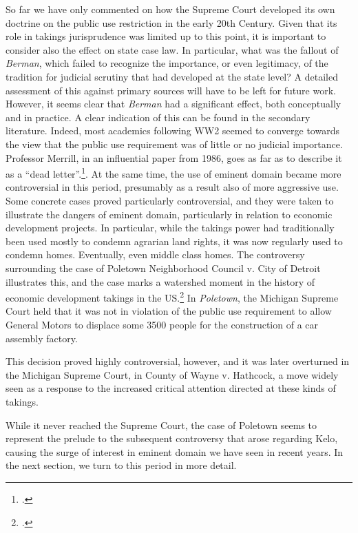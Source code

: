 So far we have only commented on how the Supreme Court developed its own doctrine on the public use restriction in the early 20th Century. Given that its role in takings jurisprudence was limited up to this point, it is important to consider also the effect on state case law. In particular, what was the fallout of {\it Berman}, which failed to recognize the importance, or even legitimacy, of the tradition for judicial scrutiny that had developed at the state level? A detailed assessment of this against primary sources will have to be left for future work. However, it seems clear that {\it Berman} had a significant effect, both conceptually and in practice. A clear indication of this can be found in the secondary literature. Indeed, most academics following WW2 seemed to converge towards the view that the public use requirement was of little or no judicial importance. Professor Merrill, in an influential paper from 1986, goes as far as to describe it as a ``dead letter''.\footcite[]{merrill86}. At the same time, the use of eminent domain became more controversial in this period, presumably as a result also of more aggressive use. Some concrete cases proved particularly controversial, and they were taken to illustrate the dangers of eminent domain, particularly in relation to economic development projects. In particular, while the takings power had traditionally been used mostly to condemn agrarian land rights, it was now regularly used to condemn homes. Eventually, even middle class homes. The controversy surrounding the case of Poletown Neighborhood Council v. City of Detroit  illustrates this, and the case marks a watershed moment in the history of  economic development takings in the US.\footcite[See][380-381]{underkuffler09} In {\it Poletown}, the Michigan Supreme Court held that it was not in violation of the public use requirement to allow General Motors to displace some 3500 people for the construction of a car assembly factory.  

This decision proved highly controversial, however, and it was later overturned in the Michigan Supreme Court, in County of Wayne v. Hathcock, a move widely seen as a response to the increased critical attention directed at these kinds of takings. 

While it never reached the Supreme Court, the case of Poletown seems to represent the prelude to the subsequent controversy that arose regarding Kelo, causing the surge of interest in eminent domain we have seen in recent years. In the next section, we turn to this period in more detail.

